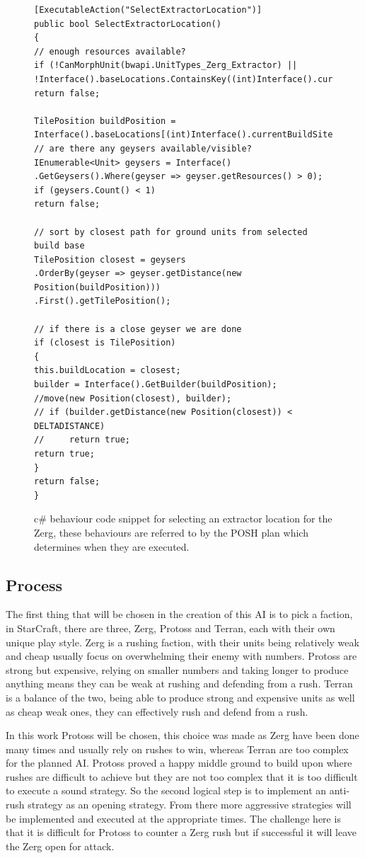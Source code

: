 \documentclass[journal]{IEEEtran}
\begin{document}
\begin{figure}[h!]
\begin{lstlisting}
[ExecutableAction("SelectExtractorLocation")]
public bool SelectExtractorLocation()
{
// enough resources available?
if (!CanMorphUnit(bwapi.UnitTypes_Zerg_Extractor) || !Interface().baseLocations.ContainsKey((int)Interface().currentBuildSite))
return false;

TilePosition buildPosition = Interface().baseLocations[(int)Interface().currentBuildSite];
// are there any geysers available/visible?
IEnumerable<Unit> geysers = Interface()
.GetGeysers().Where(geyser => geyser.getResources() > 0);
if (geysers.Count() < 1)
return false;

// sort by closest path for ground units from selected build base
TilePosition closest = geysers
.OrderBy(geyser => geyser.getDistance(new Position(buildPosition)))
.First().getTilePosition();

// if there is a close geyser we are done
if (closest is TilePosition)
{
this.buildLocation = closest;
builder = Interface().GetBuilder(buildPosition);
//move(new Position(closest), builder);
// if (builder.getDistance(new Position(closest)) < DELTADISTANCE)
//     return true;
return true;
}
return false;
}    

\end{lstlisting}
\caption{c\# behaviour code snippet for selecting an extractor location for the Zerg, these behaviours are referred to by the POSH plan which determines when they are executed.}
\label{Fig2}
\end{figure}

\subsection{Process}
The first thing that will be chosen in the creation of this AI is to pick a faction, in StarCraft, there are three, Zerg, Protoss and Terran, each with their own unique play style. Zerg is a rushing faction, with their units being relatively weak and cheap usually focus on overwhelming their enemy with numbers. Protoss are strong but expensive, relying on smaller numbers and taking longer to produce anything means they can be weak at rushing and defending from a rush. Terran is a balance of the two, being able to produce strong and expensive units as well as cheap weak ones, they can effectively rush and defend from a rush.

In this work Protoss will be chosen, this choice was made as Zerg have been done many times and usually rely on rushes to win, whereas Terran are too complex for the planned AI. Protoss proved a happy middle ground to build upon where rushes are difficult to achieve but they are not too complex that it is too difficult to execute a sound strategy. So the second logical step is to implement an anti-rush strategy as an opening strategy. From there more aggressive strategies will be implemented and executed at the appropriate times. The challenge here is that it is difficult for Protoss to counter a Zerg rush but if successful it will leave the Zerg open for attack.
\end{document}
